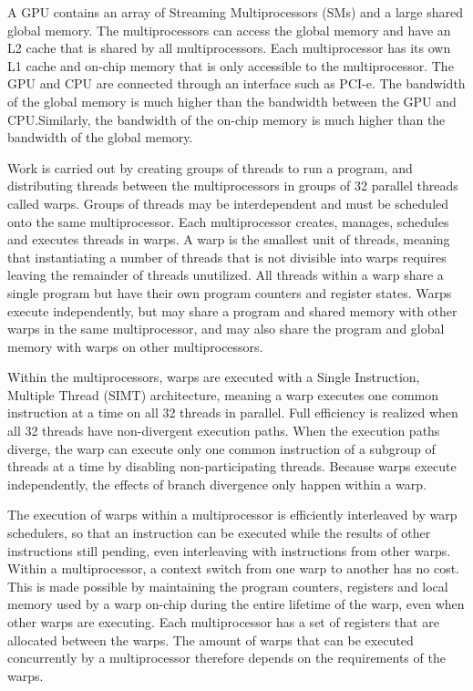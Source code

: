 A GPU contains an array of Streaming Multiprocessors (SMs) and a large shared global memory. The multiprocessors can access the global memory and have an L2 cache that is shared by all multiprocessors. Each multiprocessor has its own L1 cache and on-chip memory that is only accessible to the multiprocessor. The GPU and CPU are connected through an interface such as PCI-e. The bandwidth of the global memory is much higher than the bandwidth between the GPU and CPU.\@ Similarly, the bandwidth of the on-chip memory is much higher than the bandwidth of the global memory.

Work is carried out by creating groups of threads to run a program, and distributing threads between the multiprocessors in groups of 32 parallel threads called warps. Groups of threads may be interdependent and must be scheduled onto the same multiprocessor. Each multiprocessor creates, manages, schedules and executes threads in warps. A warp is the smallest unit of threads, meaning that instantiating a number of threads that is not divisible into warps requires leaving the remainder of threads unutilized. All threads within a warp share a single program but have their own program counters and register states. Warps execute independently, but may share a program and shared memory with other warps in the same multiprocessor, and may also share the program and global memory with warps on other multiprocessors.

Within the multiprocessors, warps are executed with a Single Instruction, Multiple Thread (SIMT) architecture, meaning a warp executes one common instruction at a time on all 32 threads in parallel. Full efficiency is realized when all 32 threads have non-divergent execution paths. When the execution paths diverge, the warp can execute only one common instruction of a subgroup of threads at a time by disabling non-participating threads. Because warps execute independently, the effects of branch divergence only happen within a warp.

The execution of warps within a multiprocessor is efficiently interleaved by warp schedulers, so that an instruction can be executed while the results of other instructions still pending, even interleaving with instructions from other warps. Within a multiprocessor, a context switch from one warp to another has no cost. This is made possible by maintaining the program counters, registers and local memory used by a warp on-chip during the entire lifetime of the warp, even when other warps are executing. Each multiprocessor has a set of registers that are allocated between the warps. The amount of warps that can be executed concurrently by a multiprocessor therefore depends on the requirements of the warps.

